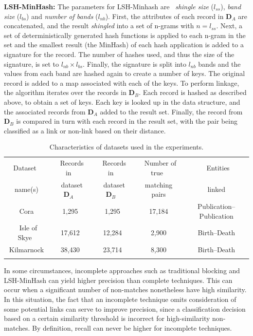 \documentclass{llncs}
\begin{document}
\textbf{LSH-MinHash:} The parameters for LSH-Minhash
are~\cite{Broder1997} \emph{shingle size} ($l_{ss}$), \emph{band size}
($l_{bs}$) and \emph{number of bands} ($l_{nb}$). First, the attributes
of each record in $\mathbf{D}_A$ are concatenated, and the result
\emph{shingled} into a set of n-grams with $n = l_{ss}$. Next, a set of
deterministically generated hash functions is applied to each n-gram in
the set and the smallest result (the MinHash) of each hash application
is added to a signature for the record. The number of hashes used, and
thus the size of the signature, is set to $l_{nb} \times l_{bs}$.
Finally, the signature is split into $l_{nb}$ bands and the values from
each band are hashed again to create a number of keys. The original
record is added to a map associated with each of the keys. To perform
linkage, the algorithm iterates over the records in $\mathbf{D}_B$. Each
record is hashed as described above, to obtain a set of keys. Each key
is looked up in the data structure, and the associated records from
$\mathbf{D}_A$ added to the result set. Finally, the record from
$\mathbf{D}_B$ is compared in turn with each record in the result set,
with the pair being classified as a link or non-link based on their
distance.

\begin{table}[t]
\caption{Characteristics of datasets used in the experiments.}
 \label{table-datasets}
  \centering
  \begin{scriptsize}
  \begin{tabular}{ccccc}
  \hline\noalign{\smallskip}
  Dataset~ & ~Records in~& ~Records in~ & ~Number of true~& ~Entities \\
    name(s)  & ~dataset $\mathbf{D}_A$~ & ~dataset $\mathbf{D}_B$~ &
    matching pairs & linked \\
  \noalign{\smallskip} \hline \noalign{\smallskip}
  Cora & 1,295 & 1,295 & 17,184 & Publication--Publication\\
  ~Isle of Skye~ & 17,612 & 12,284& 2,900 & Birth--Death \\
  Kilmarnock & ~38,430~ & ~23,714~ & ~8,300~ & ~Birth--Death~ \\
  \noalign{\smallskip} \hline
  \end{tabular}
  \end{scriptsize}
\end{table}

In some circumstances, incomplete approaches such as traditional
blocking and LSH-MinHash can yield higher precision than complete
techniques. This can occur when a significant number of non-matches
nonetheless have high similarity. In this situation, the fact that an
incomplete technique omits consideration of some potential links can
serve to improve precision, since a classification decision based on a
certain similarity threshold is incorrect for high-similarity
non-matches. By definition, recall can never be higher for incomplete
techniques.
\end{document}
